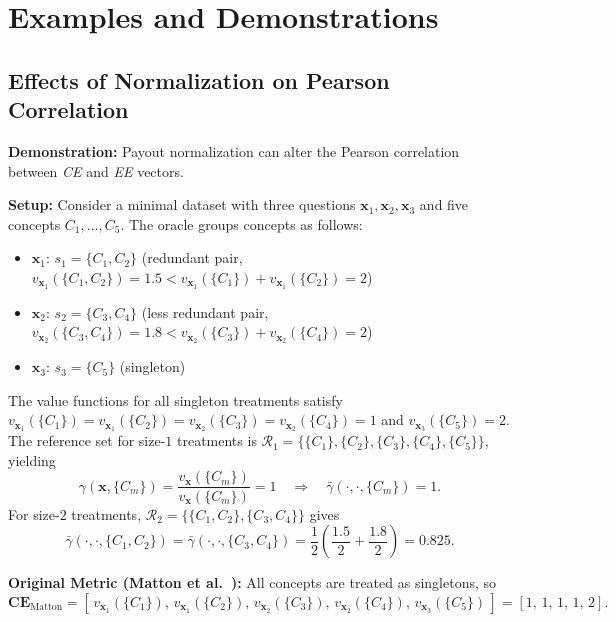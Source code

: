 \appendix
\chapter{Examples and Demonstrations}
\section{Effects of Normalization on Pearson Correlation}
\label{app:payout_normalization_correlation}
\begin{example_box}[label=ex:payout_normalization_correlation]
	\textbf{Demonstration:} Payout normalization can alter the Pearson correlation between \emph{CE} and \emph{EE} vectors.

	\smallskip
	\textbf{Setup:} Consider a minimal dataset with three questions $\mathbf{x}_1, \mathbf{x}_2, \mathbf{x}_3$ and five concepts $C_1, \dots, C_5$. The oracle groups concepts as follows:
	\begin{itemize}
		\item $\mathbf{x}_1$: $s_1 = \{C_1, C_2\}$ (redundant pair, $v_{\mathbf{x}_1}(\{C_1, C_2\}) = 1.5 < v_{\mathbf{x}_1}(\{C_1\}) + v_{\mathbf{x}_1}(\{C_2\}) = 2$)
		\item $\mathbf{x}_2$: $s_2 = \{C_3, C_4\}$ (less redundant pair, $v_{\mathbf{x}_2}(\{C_3, C_4\}) = 1.8 < v_{\mathbf{x}_2}(\{C_3\}) + v_{\mathbf{x}_2}(\{C_4\}) = 2$)
		\item $\mathbf{x}_3$: $s_3 = \{C_5\}$ (singleton)
	\end{itemize}
	The value functions for all singleton treatments satisfy $v_{\mathbf{x}_1}(\{C_1\})=v_{\mathbf{x}_1}(\{C_2\})=v_{\mathbf{x}_2}(\{C_3\})=v_{\mathbf{x}_2}(\{C_4\})=1$ and $v_{\mathbf{x}_3}(\{C_5\})=2$. The reference set for size-$1$ treatments is $\mathcal{R}_1 = \{\{C_1\}, \{C_2\}, \{C_3\}, \{C_4\}, \{C_5\}\}$, yielding
	\begin{equation*}
		\gamma(\mathbf{x}, \{C_m\}) = \frac{v_{\mathbf{x}}(\{C_m\})}{v_{\mathbf{x}}(\{C_m\})} = 1 \quad \Rightarrow \quad \bar\gamma(\cdot, \cdot, \{C_m\}) = 1.
	\end{equation*}
	For size-$2$ treatments, $\mathcal{R}_2 = \{\{C_1, C_2\}, \{C_3, C_4\}\}$ gives
	\begin{equation*}
		\bar\gamma(\cdot, \cdot, \{C_1, C_2\}) = \bar\gamma(\cdot, \cdot, \{C_3, C_4\}) = \frac{1}{2}\left(\frac{1.5}{2} + \frac{1.8}{2}\right) = 0.825.
	\end{equation*}

	\smallskip
	\textbf{Original Metric (Matton et al.~\cite{mattonWalkTalkMeasuring2024}):} All concepts are treated as singletons, so
	\begin{equation*}
		\mathbf{CE}_{\mathrm{Matton}} = \left[\,v_{\mathbf{x}_1}(\{C_1\}),\, v_{\mathbf{x}_1}(\{C_2\}),\, v_{\mathbf{x}_2}(\{C_3\}),\, v_{\mathbf{x}_2}(\{C_4\}),\, v_{\mathbf{x}_3}(\{C_5\})\,\right] = \left[1,\, 1,\, 1,\, 1,\, 2\right].
	\end{equation*}


\end{example_box}
